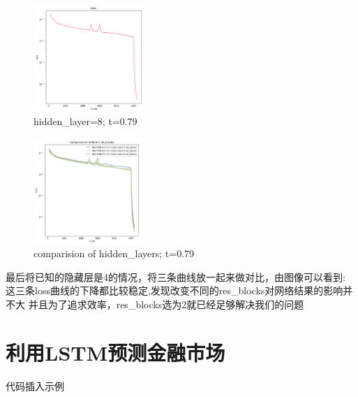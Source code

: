 \documentclass[addpoints,answers]{exam}
\begin{document}
   \begin{figure}
	\centering
	\includegraphics[height=4cm]{9.png}
	\caption{hidden\_layer=8; t=0.79}
	\end{figure}

   \begin{figure}
	\centering
	\includegraphics[height=4cm]{10.png}
	\caption{comparision of hidden\_layers; t=0.79}
	\end{figure}
	最后将已知的隐藏层是4的情况，将三条曲线放一起来做对比，由图像可以看到: 这三条loss曲线的下降都比较稳定,发现改变不同的res\_blocks对网络结果的影响并不大 并且为了追求效率，res\_blocks选为2就已经足够解决我们的问题
    
    \clearpage






\section{利用LSTM预测金融市场}

代码插入示例

\end{document}
